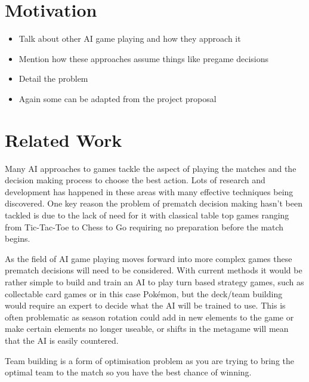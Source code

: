 \documentclass[a4paper]{article}
\newcommand{\Pokemon}{Pok\'{e}mon}
\begin{document}
\section{Motivation}
\begin{itemize}
    \item Talk about other AI game playing and how they approach it
    \item Mention how these approaches assume things like pregame decisions
    \item Detail the problem
    \item Again some can be adapted from the project proposal
\end{itemize}

\pagebreak{}

\section{Related Work}

\par
Many AI approaches to games tackle the aspect of playing the matches and the decision making process to choose the best action.
Lots of research and development has happened in these areas with many effective techniques being discovered.
One key reason the problem of prematch decision making hasn't been tackled is due to the lack of need for it with classical table top games ranging from Tic-Tac-Toe to Chess to Go requiring no preparation before the match begins.
\par
As the field of AI game playing moves forward into more complex games these prematch decisions will need to be considered.
With current methods it would be rather simple to build and train an AI to play turn based strategy games, such as collectable card games or in this case \Pokemon{}, but the deck/team building would require an expert to decide what the AI will be trained to use.
This is often problematic as season rotation could add in new elements to the game or make certain elements no longer useable, or shifts in the metagame will mean that the AI is easily countered.
\par
Team building is a form of optimisation problem as you are trying to bring the optimal team to the match so you have the best chance of winning.
\end{document}
